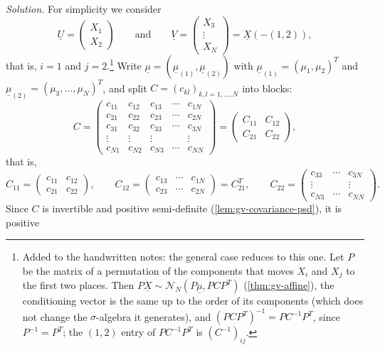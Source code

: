 \begin{example}
\emph{Solution.} For simplicity we consider
\[
  \underline U=\begin{pmatrix}X_1\\X_2\end{pmatrix}\qquad\text{and}\qquad
  \underline V=\begin{pmatrix}X_3\\\vdots\\X_N\end{pmatrix}=\underline X(-(1,2)),
\]
that is, $i=1$ and $j=2$.\footnote{Added to the handwritten notes: the general case reduces to this
one. Let $P$ be the matrix of a permutation of the components that moves $X_i$ and $X_j$ to the
first two places. Then $P\underline X\sim\mathcal N_N(P\underline\mu,PCP^T)$ (\cref{thm:gv-affine}), the conditioning
vector is the same up to the order of its components (which does not change the $\sigma$-algebra it
generates), and $(PCP^T)^{-1}=PC^{-1}P^T$, since $P^{-1}=P^T$; the $(1,2)$ entry of $PC^{-1}P^T$ is
$(C^{-1})_{ij}$.} Write $\underline\mu=(\underline\mu_{(1)},\underline\mu_{(2)})$ with
$\underline\mu_{(1)}=(\mu_1,\mu_2)^T$ and $\underline\mu_{(2)}=(\mu_3,\dots,\mu_N)^T$, and split $C=(c_{kl})_{k,l=1,\dots,N}$ into blocks:
\[
  C=\left(\begin{array}{cc|ccc}
    c_{11}&c_{12}&c_{13}&\cdots&c_{1N}\\
    c_{21}&c_{22}&c_{23}&\cdots&c_{2N}\\\hline
    c_{31}&c_{32}&c_{33}&\cdots&c_{3N}\\
    \vdots&\vdots&\vdots&&\vdots\\
    c_{N1}&c_{N2}&c_{N3}&\cdots&c_{NN}
  \end{array}\right)
  =\begin{pmatrix}C_{11}&C_{12}\\C_{21}&C_{22}\end{pmatrix},
\]
that is,
\[
  C_{11}=\begin{pmatrix}c_{11}&c_{12}\\c_{21}&c_{22}\end{pmatrix},\qquad
  C_{12}=\begin{pmatrix}c_{13}&\cdots&c_{1N}\\c_{23}&\cdots&c_{2N}\end{pmatrix}=C_{21}^T,\qquad
  C_{22}=\begin{pmatrix}c_{33}&\cdots&c_{3N}\\\vdots&&\vdots\\c_{N3}&\cdots&c_{NN}\end{pmatrix}.
\]
Since $C$ is invertible and positive semi-definite (\cref{lem:gv-covariance-psd}), it is positive

\end{example}
